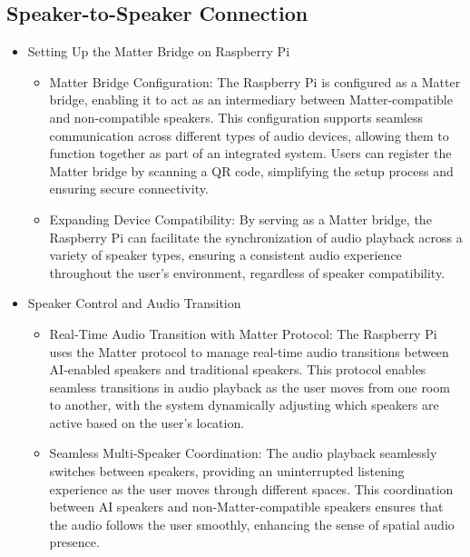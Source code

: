 \documentclass[conference]{IEEEtran}
\begin{document}
\subsection{Speaker-to-Speaker Connection}
\begin{itemize}
    \item Setting Up the Matter Bridge on Raspberry Pi
\begin{itemize}
    \item Matter Bridge Configuration: The Raspberry Pi is configured as a Matter bridge, enabling it to act as an intermediary between Matter-compatible and non-compatible speakers. This configuration supports seamless communication across different types of audio devices, allowing them to function together as part of an integrated system. Users can register the Matter bridge by scanning a QR code, simplifying the setup process and ensuring secure connectivity.\\
    \item Expanding Device Compatibility: By serving as a Matter bridge, the Raspberry Pi can facilitate the synchronization of audio playback across a variety of speaker types, ensuring a consistent audio experience throughout the user’s environment, regardless of speaker compatibility.\\
\end{itemize}
\end{itemize}
\begin{itemize}
    \item Speaker Control and Audio Transition
\begin{itemize}
    \item Real-Time Audio Transition with Matter Protocol: The Raspberry Pi uses the Matter protocol to manage real-time audio transitions between AI-enabled speakers and traditional speakers. This protocol enables seamless transitions in audio playback as the user moves from one room to another, with the system dynamically adjusting which speakers are active based on the user’s location.\\
    \item Seamless Multi-Speaker Coordination: The audio playback seamlessly switches between speakers, providing an uninterrupted listening experience as the user moves through different spaces. This coordination between AI speakers and non-Matter-compatible speakers ensures that the audio follows the user smoothly, enhancing the sense of spatial audio presence.\\
\end{itemize}
\end{itemize}
\end{document}

